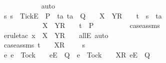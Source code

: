 \begin{isabellebody}
\ \ \ \ \ \ \ \ \ \ \isamarkupfalse%
\ auto\isanewline
\ \ \ \ \ \ \isamarkupfalse%
\isanewline
\ \ \ \ \ \ \isamarkupfalse%
\ \isamarkupfalse%
\ {\isachardoublequoteopen}{\isasymforall}s{\isachardot}\ s\ {\isacharat}\ {\isacharbrackleft}{\isacharbrackleft}Tick{\isacharbrackright}\isactrlsub E{\isacharbrackright}\ {\isasymin}\ P\ {\isasymlongrightarrow}\ {\isacharparenleft}{\isasymforall}ta{\isachardot}\ ta\ {\isasymin}\ Q\ {\isasymlongrightarrow}\ {\isasymrho}\ {\isacharat}\ {\isacharbrackleft}X\ {\isasymunion}\ Y{\isacharbrackright}\isactrlsub R\ {\isacharhash}\ {\isasymsigma}{\isacharprime}\ {\isacharat}\ t\ {\isasymnoteq}\ s\ {\isacharat}\ ta{\isacharparenright}\ {\isasymLongrightarrow}\isanewline
\ \ \ \ \ \ \ \ \ \ {\isasymrho}\ {\isacharat}\ {\isacharbrackleft}X\ {\isasymunion}\ Y{\isacharbrackright}\isactrlsub R\ {\isacharhash}\ {\isasymsigma}{\isacharprime}\ {\isacharat}\ t\ {\isasymin}\ P{\isachardoublequoteclose}\isanewline
\ \ \ \ \ \ \ \ \isamarkupfalse%
\ case{\isacharunderscore}assms\ \isamarkupfalse%
\ {\isacharparenleft}erule{\isacharunderscore}tac\ x{\isacharequal}{\isachardoublequoteopen}{\isasymrho}\ {\isacharat}\ {\isacharbrackleft}X\ {\isasymunion}\ Y{\isacharbrackright}\isactrlsub R\ {\isacharhash}\ {\isasymsigma}{\isacharprime}{\isachardoublequoteclose}\ \ allE{\isacharcomma}\ auto{\isacharparenright}\isanewline
\ \ \ \ \isamarkupfalse%
\isanewline
\ \ \ \ \ \ \isamarkupfalse%
\ {\isasymrho}{\isacharprime}\isanewline
\ \ \ \ \ \ \isamarkupfalse%
\ case{\isacharunderscore}assms{}{\isacharcolon}\ {\isachardoublequoteopen}t\ {\isacharequal}\ {\isasymrho}{\isacharprime}\ {\isacharat}\ {\isacharbrackleft}X{\isacharbrackright}\isactrlsub R\ {\isacharhash}\ {\isasymsigma}{\isachardoublequoteclose}\ {\isachardoublequoteopen}{\isasymrho}\ {\isacharequal}\ s\ {\isacharat}\ {\isasymrho}{\isacharprime}{\isachardoublequoteclose}\isanewline
\ \ \ \ \ \ \isanewline
\ \ \ \ \ \ \isamarkupfalse%
\ {\isachardoublequoteopen}{\isacharbraceleft}e{\isachardot}\ e\ {\isasymnoteq}\ Tock\ {\isasymand}\ {\isasymrho}{\isacharprime}\ {\isacharat}\ {\isacharbrackleft}{\isacharbrackleft}e{\isacharbrackright}\isactrlsub E{\isacharbrackright}\ {\isasymin}\ Q\ {\isasymor}\ e\ {\isacharequal}\ Tock\ {\isasymand}\ {\isasymrho}{\isacharprime}\ {\isacharat}\ {\isacharbrackleft}{\isacharbrackleft}X{\isacharbrackright}\isactrlsub R{\isacharcomma}\ {\isacharbrackleft}e{\isacharbrackright}\isactrlsub E{\isacharbrackright}\ {\isasymin}\ Q{\isacharbraceright}\ {\isasymsubseteq}\isanewline

\end{isabellebody}
